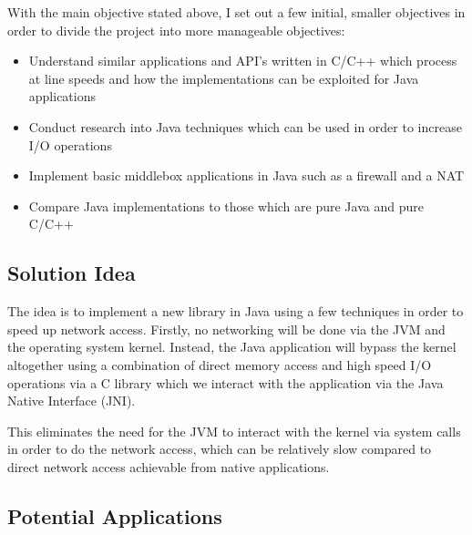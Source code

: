\documentclass[final_report.tex]{subfiles}
\begin{document}
With the main objective stated above, I set out a few initial, smaller objectives in order to divide the project into more manageable objectives:
\begin{itemize}
	\item Understand similar applications and API's written in C/C++ which process at line speeds and how the implementations can be exploited for Java applications
	\item Conduct research into Java techniques which can be used in order to increase I/O operations
	\item Implement basic middlebox applications in Java such as a firewall and a NAT
	\item Compare Java implementations to those which are pure Java and pure C/C++
\end{itemize}

\subsection{Solution Idea}
The idea is to implement a new library in Java using a few techniques in order to speed up network access. Firstly, no networking will be done via the JVM and the operating system kernel. Instead, the Java application will bypass the kernel altogether using a combination of direct memory access and high speed I/O operations via a C library which we interact with the application via the Java Native Interface (JNI).

This eliminates the need for the JVM to interact with the kernel via system calls in order to do the network access, which can be relatively slow compared to direct network access achievable from native applications.

\subsection{Potential Applications}
\end{document}
